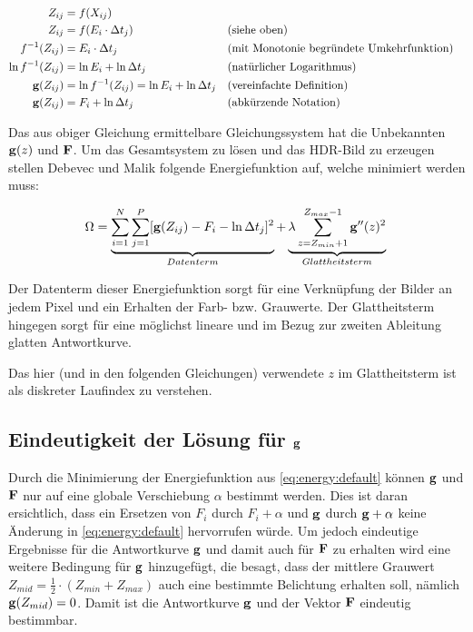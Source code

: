 \begin{align*}
Z_{ij} &= f(X_{ij})\\
Z_{ij} &=f(E_i \cdot \Delta t_j)&&\text{(siehe oben)}\\
f^{-1}(Z_{ij}) &= E_i \cdot \Delta t_j & &\text{(mit Monotonie begründete Umkehrfunktion)}\\
\ln f^{-1}(Z_{ij}) &= \ln E_i + \ln \Delta t_j&&\text{(natürlicher Logarithmus)}\\
\mathbf g(Z_{ij}) &= \ln f^{-1}(Z_{ij}) = \ln E_i + \ln \Delta t_j && \text{(vereinfachte Definition)}\\
\mathbf g(Z_{ij}) &= F_i + \ln \Delta t_j && \text{(abkürzende Notation)}\\
\end{align*}


Das aus obiger Gleichung ermittelbare Gleichungssystem hat die Unbekannten $\mathbf g(z)$ und $\mathbf F$. Um das Gesamtsystem zu lösen und das \gls{HDR}-Bild zu erzeugen stellen Debevec und Malik folgende Energiefunktion auf, welche minimiert werden muss:

\begin{equation}
\label{eq:energy:default}
\Omega = \underbrace{\sum \limits_{i=1}^{N} \sum \limits_{j=1}^{P}[\mathbf g(Z_{ij}) - F_i - \ln \Delta t_j]^2}_{Datenterm} + \underbrace{\lambda  \sum \limits_{z=Z_{min}+1}^{Z_{max}-1} \mathbf{g}''(z)^2}_{Glattheitsterm}\\
\end{equation}

Der Datenterm dieser Energiefunktion sorgt für eine Verknüpfung der Bilder an jedem Pixel und ein Erhalten der Farb- bzw. Grauwerte. Der Glattheitsterm hingegen sorgt für eine möglichst lineare und im Bezug zur zweiten Ableitung glatten Antwortkurve.

Das hier (und in den folgenden Gleichungen) verwendete $z$ im Glattheitsterm ist als diskreter Laufindex zu verstehen. 

\subsection{Eindeutigkeit der Lösung für $\mathbf g$}
\label{sec:eindeutigkeit}
Durch die Minimierung der Energiefunktion aus \autoref{eq:energy:default} können $\mathbf g$ und $\mathbf F$ nur auf eine globale Verschiebung $\alpha$ bestimmt werden. Dies ist daran ersichtlich, dass ein Ersetzen von $F_i$ durch $F_i + \alpha$ und $\mathbf g$ durch $\mathbf g + \alpha$ keine Änderung in \autoref{eq:energy:default} hervorrufen würde. Um jedoch eindeutige Ergebnisse für die Antwortkurve $\mathbf g$ und damit auch für $\mathbf F$ zu erhalten wird eine weitere Bedingung für $\mathbf g$ hinzugefügt, die besagt, dass der mittlere Grauwert $Z_{mid} = \frac{1}{2}\cdot(Z_{min}+Z_{max})$ auch eine bestimmte  Belichtung erhalten soll, nämlich $\mathbf g(Z_{mid}) = 0$. Damit ist die Antwortkurve $\mathbf g$ und der Vektor $\mathbf F$ eindeutig bestimmbar.

